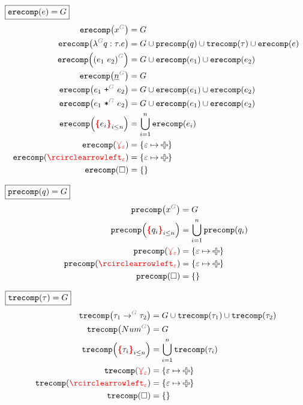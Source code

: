 \noindent $\boxed{\operatorname{\texttt{erecomp}}\mathopen{}\left(e\right)\mathclose{} = G}$
%
\begin{align*}
  \erecomp{\eVar{G}{x}} &= G
  \\
  \erecomp{\eFun{G}{q}{\tau}{e}}
    &= G \cup \precomp{q} \cup \trecomp{\tau} \cup \erecomp{e}
  \\
  \erecomp{\eApp{G}{e_1}{e_2}}
    &= G \cup \erecomp{e_1} \cup \erecomp{e_2}
  \\
  \erecomp{\eNum{G}{n}} &= G
  \\
  \erecomp{\ePlus{G}{e_1}{e_2}}
    &= G \cup \erecomp{e_1} \cup \erecomp{e_2}
  \\
  \erecomp{\eTimes{G}{e_1}{e_2}}
    &= G \cup \erecomp{e_1} \cup \erecomp{e_2}
  \\
  \erecomp{\conflictHole{e_i}_{i \leq n}}
  &= \bigcup_{i=1}^n \erecomp{e_i}
  \\
  \erecomp{\multiVertex{\e}} &= \SetOf{\e \mapsto \Plus}
  \\
  \erecomp{\cycleVertex{\e}} &= \SetOf{\e \mapsto \Plus}
  \\
  \erecomp{\hole} &= \SetOf{}
\end{align*}

\noindent $\boxed{\operatorname{\texttt{precomp}}\mathopen{}\left(q\right)\mathclose{} = G}$
%
\begin{align*}
  \precomp{\pVar{G}{x}} &= G
  \\
  \precomp{\conflictHole{q_i}_{i \leq n}} &= \bigcup_{i=1}^n \precomp{q_i}
  \\
  \precomp{\multiVertex{\e}} &= \SetOf{\e \mapsto \Plus}
  \\
  \precomp{\cycleVertex{\e}} &= \SetOf{\e \mapsto \Plus}
  \\
  \precomp{\hole} &= \SetOf{}
\end{align*}

\noindent $\boxed{\operatorname{\texttt{trecomp}}\mathopen{}\left(\tau\right)\mathclose{} = G}$
%
\begin{align*}
  \trecomp{\tArrow{G}{\tau_1}{\tau_2}}
    &= G \cup \trecomp{\tau_1} \cup \trecomp{\tau_2}
  \\
  \trecomp{\tNum{G}} &= G
  \\
  \trecomp{\conflictHole{\tau_i}_{i \leq n}} &= \bigcup_{i=1}^n \trecomp{\tau_i}
  \\
  \trecomp{\multiVertex{\e}} &= \SetOf{\e \mapsto \Plus}
  \\
  \trecomp{\cycleVertex{\e}} &= \SetOf{\e \mapsto \Plus}
  \\
  \trecomp{\hole} &= \SetOf{}
\end{align*}


